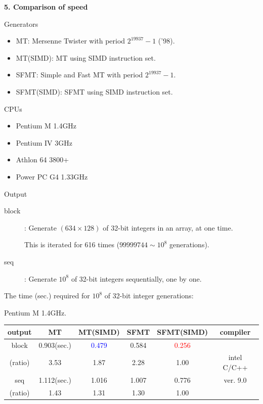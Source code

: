 \documentclass[a4j,12pt,landscape]{jarticle}
\begin{document}
\newpage
\noindent
{\bf 5. Comparison of speed}
\begin{description}
  \item Generators
    \begin{itemize}
    \item MT: Mersenne Twister with period $2^{19937}-1$ ('98).
    \item MT(SIMD): MT using SIMD instruction set.
    \item SFMT: Simple and Fast MT with period $2^{19937}-1$.
    \item SFMT(SIMD): SFMT using SIMD instruction set.
    \end{itemize}
  \item CPUs
    \begin{itemize}
      \item Pentium M 1.4GHz
      \item Pentium IV 3GHz
      \item Athlon 64 3800+
      \item Power PC G4 1.33GHz  
    \end{itemize}
    \newpage
    \item Output
      \begin{description}
      \item[block]: Generate $(634 \times 128)$ of 32-bit integers 
        in an array, at one time. 

        This is iterated for 616 times 
        ($99999744\sim 10^8$ generations).
      \item[seq]: Generate $10^8$ of 32-bit integers sequentially,
        one by one.
      \end{description}
    \end{description}

\newpage
\begin{center}
The time (sec.) required for $10^8$ 
of 32-bit integer generations:

Pentium M 1.4GHz. 

\vskip 2mm
\begin{tabular}{|c||c|c|c|c|c|}
\hline
output & MT & MT{\Large(SIMD)} & SFMT & SFMT{\Large (SIMD)} & compiler
 \\ \hline \hline
 block   & 0.903(sec.) & \textcolor{blue}{0.479}
 & 0.584 & \textcolor{red}{0.256} &    \\ \cline{2-5}
 (ratio) & 3.53\phantom{0}  & 1.87\phantom{0}  & 2.28\phantom{0}  & 1.00\phantom{0}  & intel C/C++ \\ \cline{1-5}
 seq     & 1.112(sec.) & 1.016 & 1.007 & 0.776 & ver. 9.0\\ \cline{2-5}
 (ratio) & 1.43\phantom{0} & 1.31\phantom{0}  & 1.30\phantom{0}  & 1.00\phantom{0}  &  \\ \hline
\end{tabular}
\end{center}
\end{document}
